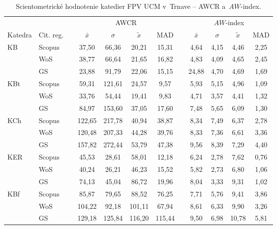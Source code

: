 \begin{table}
  \centering\small
  \caption[Hodnotenie FPV -- AWCR a~$AW$-index]%
  {Scientometrické hodnotenie katedier FPV UCM v~Trnave -- AWCR a~$AW$-index.}
  \label{tab:5-staff.results}
  \begin{tabularx}{\textwidth}{XXp{0.2ex}ccccp{0.2ex}cccc}
    \toprule
    & & & \multicolumn{4}{c}{AWCR} & & \multicolumn{4}{c}{$AW$-index} \\
    \cmidrule{4-7}\cmidrule{9-12}
    Katedra & Cit. reg. & & $\bar{x}$ & $\sigma$ & $\tilde{x}$ & MAD & & $\bar{x}$ & $\sigma$ & $\tilde{x}$ & MAD \\[0.3ex]
    \midrule
    KB   & Scopus & & 37,50  & 66,36  & 20,21  & 15,31  & & 4,64  & 4,15 & 4,46  & 2,25 \\
         & WoS    & & 38,77  & 66,64  & 21,65  & 16,82  & & 4,83  & 4,09 & 4,65  & 2,45 \\
         & GS     & & 23,88  & 91,79  & 22,06  & 15,15  & & 24,88 & 4,70 & 4,69  & 1,69 \\[1ex]
    KBt  & Scopus & & 59,31  & 121,61 & 24,57  & 9,57   & & 5,93  & 5,15 & 4,96  & 1,09 \\
         & WoS    & & 33,76  & 54,44  & 19,41  & 9,83   & & 4,71  & 3,57 & 4,41  & 1,32 \\
         & GS     & & 84,97  & 153,60 & 37,05  & 17,60  & & 7,48  & 5,65 & 6,09  & 1,30 \\[1ex]
    KCh  & Scopus & & 122,65 & 217,78 & 40,94  & 38,87  & & 8,34  & 7,49 & 6,37  & 2,78 \\
         & WoS    & & 120,48 & 207,33 & 44,28  & 39,76  & & 8,33  & 7,36 & 6,61  & 3,36 \\
         & GS     & & 157,82 & 272,44 & 53,79  & 47,38  & & 9,56  & 8,39 & 7,29  & 4,40 \\[1ex]
    KER  & Scopus & & 45,53  & 28,61  & 58,01  & 12,18  & & 6,24  & 2,78 & 7,62  & 0,76 \\
         & WoS    & & 40,24  & 26,21  & 46,23  & 15,52  & & 5,82  & 2,73 & 6,80  & 1,06 \\
         & GS     & & 74,13  & 45,04  & 86,72  & 19,96  & & 8,04  & 3,33 & 9,31  & 1,02 \\[1ex]
    KBf  & Scopus & & 85,87  & 79,65  & 88,52  & 76,25  & & 7,71  & 5,76 & 9,41  & 3,86 \\
         & WoS    & & 104,22 & 92,18  & 101,11 & 67,94  & & 8,61  & 6,33 & 9,90  & 3,26 \\
         & GS     & & 129,18 & 125,84 & 116,20 & 115,44 & & 9,50  & 6,98 & 10,78 & 5,81 \\[1ex]

\end{tabularx}
\end{table}
